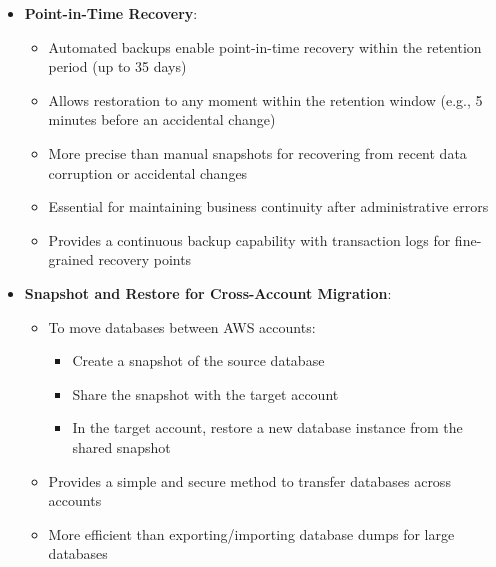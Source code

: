 \documentclass[11pt,a4paper]{report}
\begin{document}
\begin{itemize}
\begin{itemize}
\begin{itemize}
  \item Use RDS Multi-AZ DB cluster deployment (not just a Multi-AZ DB instance)
  \item Point read workloads to the reader endpoint
\end{itemize}
  \item This configuration provides automatic failover support in under 40 seconds
  \item Allows read traffic to be offloaded from the primary instance
  \item More cost-effective than creating and managing separate read replicas
  \item Simplifies the architecture compared to creating multiple standalone read replicas
\end{itemize}
  \item \textbf{Point-in-Time Recovery}:
\begin{itemize}
  \item Automated backups enable point-in-time recovery within the retention period (up to 35 days)
  \item Allows restoration to any moment within the retention window (e.g., 5 minutes before an accidental change)
  \item More precise than manual snapshots for recovering from recent data corruption or accidental changes
  \item Essential for maintaining business continuity after administrative errors
  \item Provides a continuous backup capability with transaction logs for fine-grained recovery points
\end{itemize}
  \item \textbf{Snapshot and Restore for Cross-Account Migration}:
\begin{itemize}
  \item To move databases between AWS accounts:
\begin{itemize}
  \item Create a snapshot of the source database
  \item Share the snapshot with the target account
  \item In the target account, restore a new database instance from the shared snapshot
\end{itemize}
  \item Provides a simple and secure method to transfer databases across accounts
  \item More efficient than exporting/importing database dumps for large databases

\end{itemize}
\end{itemize}
\end{document}
